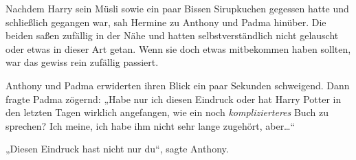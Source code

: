 Nachdem Harry sein Müsli sowie ein paar Bissen Sirupkuchen gegessen hatte und schließlich gegangen war, sah Hermine zu Anthony und Padma hinüber. Die beiden saßen zufällig in der Nähe und hatten selbstverständlich nicht gelauscht oder etwas in dieser Art getan. Wenn sie doch etwas mitbekommen haben sollten, war das gewiss rein zufällig passiert.

Anthony und Padma erwiderten ihren Blick ein paar Sekunden schweigend. Dann fragte Padma zögernd: „Habe nur ich diesen Eindruck oder hat Harry Potter in den letzten Tagen wirklich angefangen, wie ein noch \emph{komplizierteres} Buch zu sprechen? Ich meine, ich habe ihm nicht sehr lange zugehört, aber…“

„Diesen Eindruck hast nicht nur du“, sagte Anthony.

